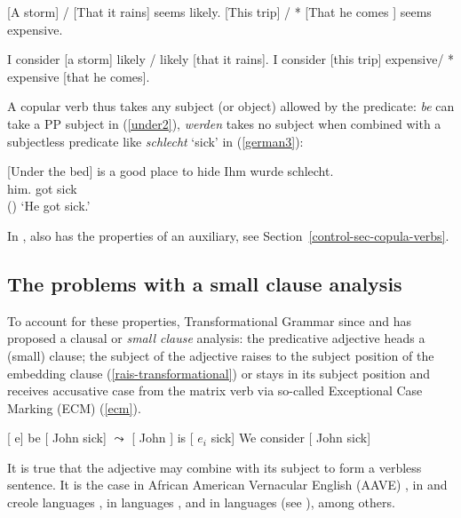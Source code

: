 \documentclass[output=paper
	        ,collection
	        ,collectionchapter
 	        ,biblatex
                ,babelshorthands
                ,newtxmath
                ,draftmode
                ,colorlinks, citecolor=brown
]{langscibook}
\begin{document}
\begin{exe}
\ex \label{storm}
\begin{xlist}
\ex{} [A storm] / [That it rains] seems likely.
\ex{} [This trip] / * [That he comes ] seems expensive.
\end{xlist}
\ex \begin{xlist}
\ex 	I consider [a storm] likely / likely [that it rains].
\ex 	I consider [this trip] expensive/ * expensive [that he comes].
\end{xlist}	
\end{exe}


A copular verb thus takes any subject (or object) allowed by the predicate: \emph{be} can take a PP
subject in  (\ref{under2}), \emph{werden} takes no subject when combined with a
subjectless predicate like \emph{schlecht} `sick' in  (\ref{german3}):

\eal
\ex{}[Under the bed] is a good place to hide \label{under2}
\ex
\label{german3} 
\gll Ihm        wurde schlecht.\footnotemark\\
     him.\DAT{} got   sick\\\hfill()
\glt `He got sick.'
\zl

 In ,  also has the properties of an auxiliary, see Section~\ref{control-sec-copula-verbs}.

\subsection{The problems with a small clause analysis}

To account for these properties, Transformational Grammar since \citet{Stowell1983}\addpages and
\citet{Chomsky1986}\addpages has proposed a clausal or \emph{small clause} analysis: the predicative
adjective heads a (small) clause; the subject of the adjective raises to the subject position of the
embedding clause (\ref{rais-transformational}) or stays in its subject position and receives accusative case from
the matrix verb via so-called Exceptional Case Marking (ECM) (\ref{ecm}).


\eal
\ex
\label{rais-transformational}
{}[ e] be [ John sick] $\leadsto$  [ John ] is  [ $e_{i}$ sick]
\ex
\label{ecm}
We consider [ John sick]
\zl

It is true that the adjective may combine with its subject to form a verbless sentence. It is the
case in African American Vernacular English (AAVE) \citep{Bender2001a}, in  \citep{Laurens2008} and creole languages
\citep{HenriandAbeille2007}, in  languages \citep{Zec87a-u}, and in  languages (see
\citealp{Alqurashi:Borsley:14}), among others. 
\end{document}
